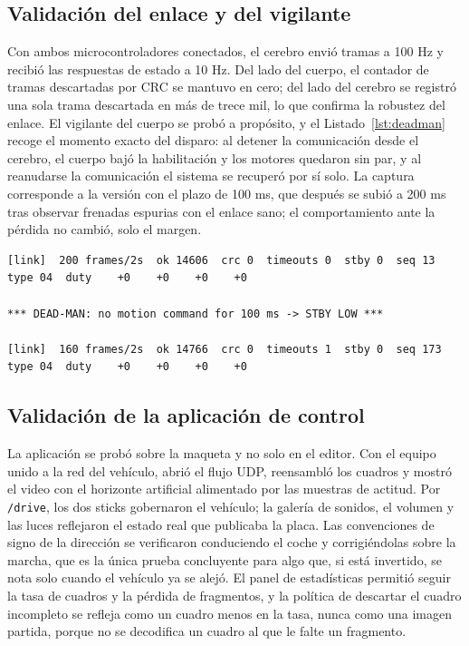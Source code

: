 \documentclass[journal]{IEEEtran}
\begin{document}
\subsection{Validación del enlace y del vigilante}
Con ambos microcontroladores conectados, el cerebro envió tramas a 100 Hz y recibió las respuestas de estado a 10 Hz. Del lado del cuerpo, el contador de tramas descartadas por CRC se mantuvo en cero; del lado del cerebro se registró una sola trama descartada en más de trece mil, lo que confirma la robustez del enlace. El vigilante del cuerpo se probó a propósito, y el Listado~\ref{lst:deadman} recoge el momento exacto del disparo: al detener la comunicación desde el cerebro, el cuerpo bajó la habilitación y los motores quedaron sin par, y al reanudarse la comunicación el sistema se recuperó por sí solo. La captura corresponde a la versión con el plazo de 100 ms, que después se subió a 200 ms tras observar frenadas espurias con el enlace sano; el comportamiento ante la pérdida no cambió, solo el margen.

\begin{lstlisting}[style=consola, caption={Disparo del vigilante al interrumpir la comunicación desde el cerebro.}, label={lst:deadman}]
[link]  200 frames/2s  ok 14606  crc 0  timeouts 0  stby 0  seq 13 type 04  duty    +0    +0    +0    +0

*** DEAD-MAN: no motion command for 100 ms -> STBY LOW ***

[link]  160 frames/2s  ok 14766  crc 0  timeouts 1  stby 0  seq 173 type 04  duty    +0    +0    +0    +0
\end{lstlisting}

\subsection{Validación de la aplicación de control}
La aplicación se probó sobre la maqueta y no solo en el editor. Con el equipo unido a la red del vehículo, abrió el flujo UDP, reensambló los cuadros y mostró el video con el horizonte artificial alimentado por las muestras de actitud. Por \texttt{/drive}, los dos sticks gobernaron el vehículo; la galería de sonidos, el volumen y las luces reflejaron el estado real que publicaba la placa. Las convenciones de signo de la dirección se verificaron conduciendo el coche y corrigiéndolas sobre la marcha, que es la única prueba concluyente para algo que, si está invertido, se nota solo cuando el vehículo ya se alejó. El panel de estadísticas permitió seguir la tasa de cuadros y la pérdida de fragmentos, y la política de descartar el cuadro incompleto se refleja como un cuadro menos en la tasa, nunca como una imagen partida, porque no se decodifica un cuadro al que le falte un fragmento.
\end{document}
